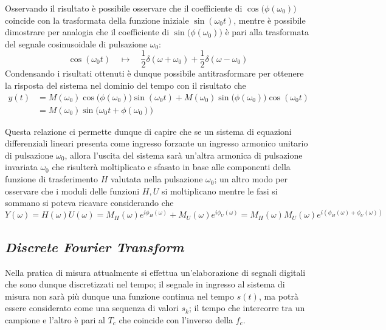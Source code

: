 		Osservando il risultato è possibile osservare che il coefficiente di $\cos\big(\phi(\omega_0)\big)$ coincide con la trasformata della funzione iniziale $\sin(\omega_0t)$, mentre è possibile dimostrare per analogia che il coefficiente di $\sin\big(\phi(\omega_0)\big)$ è pari alla trasformata del segnale cosinusoidale di pulsazione $\omega_0$:
		\[ \cos(\omega_0 t) \quad \mapsto \quad \frac 1 2 \delta(\omega+\omega_0) + \frac 1 2 \delta(\omega-\omega_0)  \]
		Condensando i risultati ottenuti è dunque possibile antitrasformare per ottenere la risposta del sistema nel dominio del tempo con il risultato che
		\begin{equation}
		\begin{split}
			y(t) & = M(\omega_0) \cos\big(\phi(\omega_0)\big) \sin(\omega_0t) + M(\omega_0) \sin\big(\phi(\omega_0)\big) \cos(\omega_0 t) \\
			& =M(\omega_0) \sin\big(\omega_0 t + \phi(\omega_0)\big)
		\end{split}
		\end{equation}
		
		Questa relazione ci permette dunque di capire che se un sistema di equazioni differenziali lineari presenta come ingresso forzante un ingresso armonico unitario di pulsazione $\omega_0$, allora l'uscita del sistema sarà un'altra armonica di pulsazione invariata $\omega_0$ che risulterà moltiplicato e sfasato in base alle componenti della funzione di trasferimento $H$ valutata nella pulsazione $\omega_0$; un altro modo per osservare che i moduli delle funzioni $H,U$ si moltiplicano mentre le fasi si sommano si poteva ricavare considerando che
		\[Y(\omega) = H(\omega) U(\omega) = M_H(\omega) e^{i\phi_H(\omega)} + M_U(\omega) e^{i\phi_U(\omega)} = M_H(\omega)M_U(\omega) e^{i \left( \phi_H(\omega) + \phi_U(\omega) \right)}\]
	
	\subsection{\textit{Discrete Fourier Transform}}
		Nella pratica di misura attualmente si effettua un'elaborazione di segnali digitali che sono dunque discretizzati nel tempo; il segnale in ingresso al sistema di misura non sarà più dunque una funzione continua nel tempo $s(t)$, ma potrà essere considerato come una sequenza di valori $s_k$; il tempo che intercorre tra un campione e l'altro è pari al  $T_c$ che coincide con l'inverso della  $f_c$.
		
